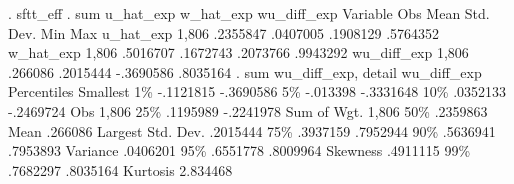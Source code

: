 . sftt_eff
{\smallskip}
. sum u_hat_exp w_hat_exp wu_diff_exp
{\smallskip}
    Variable {\VBAR}        Obs        Mean    Std. Dev.       Min        Max
   u_hat_exp {\VBAR}      1,806    .2355847    .0407005   .1908129   .5764352
   w_hat_exp {\VBAR}      1,806    .5016707    .1672743   .2073766   .9943292
 wu_diff_exp {\VBAR}      1,806     .266086    .2015444  -.3690586   .8035164
{\smallskip}
. sum wu_diff_exp, detail
{\smallskip}
                         wu_diff_exp
      Percentiles      Smallest
 1\%    -.1121815      -.3690586
 5\%     -.013398      -.3331648
10\%     .0352133      -.2469724       Obs               1,806
25\%     .1195989      -.2241978       Sum of Wgt.       1,806
{\smallskip}
50\%     .2359863                      Mean            .266086
                        Largest       Std. Dev.      .2015444
75\%     .3937159       .7952944
90\%     .5636941       .7953893       Variance       .0406201
95\%     .6551778       .8009964       Skewness       .4911115
99\%     .7682297       .8035164       Kurtosis       2.834468
{\smallskip}
